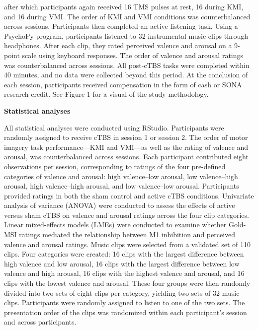 \documentclass[
]{article}
\begin{document}
after which participants again received 16 TMS pulses at rest, 16 during
KMI, and 16 during VMI. The order of KMI and VMI conditions was
counterbalanced across sessions. Participants then completed an active
listening task. Using a PsychoPy program, participants listened to 32
instrumental music clips through headphones. After each clip, they rated
perceived valence and arousal on a 9-point scale using keyboard
responses. The order of valence and arousal ratings was counterbalanced
across sessions. All post-cTBS tasks were completed within 40 minutes,
and no data were collected beyond this period. At the conclusion of each
session, participants received compensation in the form of cash or SONA
research credit. See Figure 1 for a visual of the study methodology.

\textbf{Statistical analyses}

All statistical analyses were conducted using RStudio. Participants were
randomly assigned to receive cTBS in session 1 or session 2. The order
of motor imagery task performance---KMI and VMI---as well as the rating
of valence and arousal, was counterbalanced across sessions. Each
participant contributed eight observations per session, corresponding to
ratings of the four pre-defined categories of valence and arousal: high
valence--low arousal, low valence--high arousal, high valence--high
arousal, and low valence--low arousal. Participants provided ratings in
both the sham control and active cTBS conditions. Univariate analysis of
variance (ANOVA) were conducted to assess the effects of active versus
sham cTBS on valence and arousal ratings across the four clip
categories. Linear mixed-effects models (LMEs) were conducted to examine
whether Gold-MSI ratings mediated the relationship between M1 inhibition
and perceived valence and arousal ratings. Music clips were selected
from a validated set of 110 clips. Four categories were created: 16
clips with the largest difference between high valence and low arousal,
16 clips with the largest difference between low valence and high
arousal, 16 clips with the highest valence and arousal, and 16 clips
with the lowest valence and arousal. These four groups were then
randomly divided into two sets of eight clips per category, yielding two
sets of 32 music clips. Participants were randomly assigned to listen to
one of the two sets. The presentation order of the clips was randomized
within each participant's session and across participants.

\begin{verbatim}
\end{verbatim}
\end{document}
